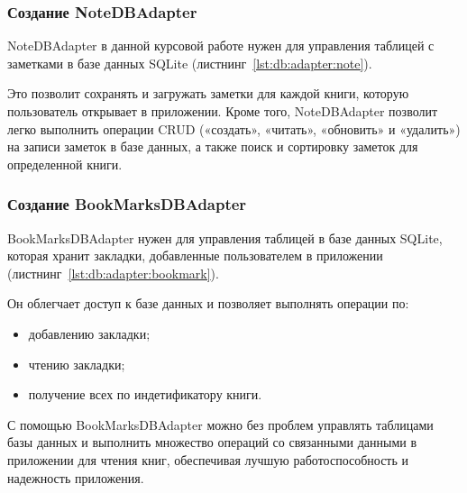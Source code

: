 \subsubsection{Создание NoteDBAdapter}
NoteDBAdapter в данной курсовой работе нужен для управления таблицей
с заметками в базе данных SQLite
(листнинг~\ref{lst:db:adapter:note}).\par
Это позволит сохранять и загружать заметки для каждой книги,
которую пользователь открывает в приложении.
Кроме того, NoteDBAdapter позволит легко выполнить операции
CRUD («создать», «читать», «обновить» и «удалить») на записи заметок
в базе данных, а также поиск и сортировку заметок для определенной книги.

\subsubsection{Создание BookMarksDBAdapter}
BookMarksDBAdapter нужен для управления таблицей в базе данных SQLite,
которая хранит закладки, добавленные пользователем в приложении
(листнинг~\ref{lst:db:adapter:bookmark}).\par
Он облегчает доступ к базе данных и позволяет выполнять
операции по:

\begin{itemize}
	\item добавлению закладки;
	\item чтению закладки;
	\item получение всех по индетификатору книги. 
\end{itemize}

С помощью BookMarksDBAdapter можно без проблем управлять таблицами
базы данных и выполнить множество операций со связанными данными
в приложении для чтения книг, обеспечивая лучшую работоспособность
и надежность приложения.

